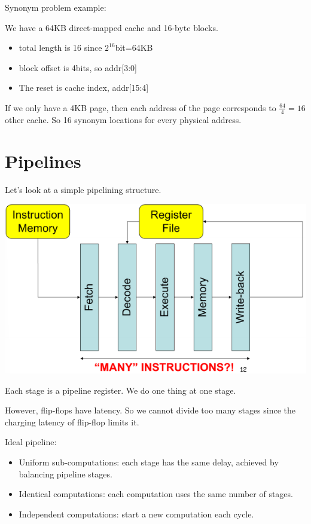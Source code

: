 \documentclass[letterpaper,12pt]{article}
\begin{document}
Synonym problem example:

We have a 64KB direct-mapped cache and 16-byte blocks.

\begin{itemize}
    \item total length is 16 since $2^{16}$bit=64KB
    \item block offset is 4bits, so addr[3:0]
    \item The reset is cache index, addr[15:4]
\end{itemize}

If we only have a 4KB page, then each address of the page corresponds to $\frac{64}{4}=16$ other cache.
So 16 synonym locations for every physical address.

\section{Pipelines}

Let's look at a simple pipelining structure.

\includegraphics*[scale = 0.7]{./Image/Simple pipeline.png}

Each stage is a pipeline register. We do one thing at one stage.

However, flip-flops have latency. So we cannot divide too many stages since the charging latency of flip-flop limits it.

Ideal pipeline:
\begin{itemize}
    \item Uniform sub-computations: each stage has the same delay, achieved by balancing pipeline stages.
    \item Identical computations: each computation uses the same number of stages.
    \item Independent computations: start a new computation each cycle.
\end{itemize}
\end{document}
